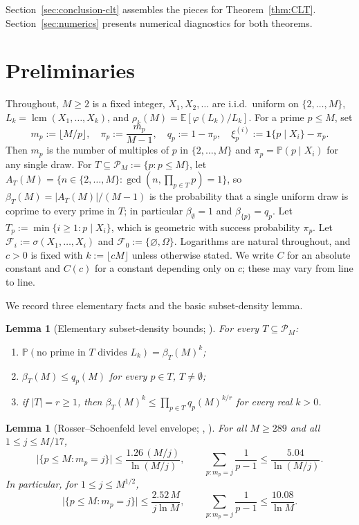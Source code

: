 \documentclass[11pt]{article}
\newtheorem{lemma}[theorem]{Lemma}
\theoremstyle{remark}
\newcommand{\lcm}{\operatorname{lcm}}
\newcommand{\gcdop}{\operatorname{gcd}}
\newcommand{\PP}{\mathbb{P}}
\newcommand{\EE}{\mathbb{E}}
\newcommand{\F}{\mathcal{F}}
\newcommand{\one}{\mathbf{1}}
\newcommand{\PM}{\mathcal{P}_M}
\begin{document}
Section~\ref{sec:conclusion-clt} assembles the pieces for Theorem~\ref{thm:CLT}. Section~\ref{sec:numerics} presents numerical diagnostics for both theorems.

\section{Preliminaries}\label{sec:prelim}

Throughout, $M \geq 2$ is a fixed integer, $X_1, X_2, \ldots$ are i.i.d.\ uniform on $\{2, \ldots, M\}$, $L_k = \lcm(X_1, \ldots, X_k)$, and $\rho_k(M) = \EE[\varphi(L_k)/L_k]$. For a prime $p \leq M$, set
\[
m_p := \lfloor M/p \rfloor, \quad \pi_p := \frac{m_p}{M-1}, \quad q_p := 1 - \pi_p, \quad \xi_p^{(i)} := \one\{p \mid X_i\} - \pi_p.
\]
Then $m_p$ is the number of multiples of $p$ in $\{2, \ldots, M\}$ and $\pi_p = \PP(p \mid X_i)$ for any single draw. For $T \subseteq \PM := \{p : p \leq M\}$, let $A_T(M) = \{n \in \{2, \ldots, M\} : \gcdop(n, \prod_{p \in T} p) = 1\}$, so $\beta_T(M) = |A_T(M)|/(M-1)$ is the probability that a single uniform draw is coprime to every prime in $T$; in particular $\beta_\emptyset = 1$ and $\beta_{\{p\}} = q_p$. Let $T_p := \min\{i \geq 1 : p \mid X_i\}$, which is geometric with success probability $\pi_p$. Let $\F_i := \sigma(X_1, \ldots, X_i)$ and $\F_0 := \{\varnothing, \Omega\}$. Logarithms are natural throughout, and $c > 0$ is fixed with $k := \lfloor cM \rfloor$ unless otherwise stated. We write $C$ for an absolute constant and $C(c)$ for a constant depending only on $c$; these may vary from line to line.

We record three elementary facts and the basic subset-density lemma.

\begin{lemma}[Elementary subset-density bounds; {\cite[Lems.~2.1--2.4]{wakid1}}]\label{lem:beta-basic}
For every $T \subseteq \PM$:
\begin{enumerate}[label=(\roman*), leftmargin=2em]
\item $\PP(\text{no prime in $T$ divides $L_k$}) = \beta_T(M)^k$;
\item $\beta_T(M) \leq q_p(M)$ for every $p \in T$, $T \neq \emptyset$;
\item if $|T| = r \geq 1$, then $\beta_T(M)^k \leq \prod_{p \in T} q_p(M)^{k/r}$ for every real $k > 0$.
\end{enumerate}
\end{lemma}

\begin{lemma}[Rosser--Schoenfeld level envelope; {\cite{RosserSchoenfeld1962}, \cite[Lem.~6.3]{wakid1}}]\label{lem:envelope}
For all $M \geq 289$ and all $1 \leq j \leq M/17$,
\[
\bigl|\{p \leq M : m_p = j\}\bigr| \leq \frac{1.26\,(M/j)}{\ln(M/j)}, \qquad \sum_{p \colon m_p = j} \frac{1}{p-1} \leq \frac{5.04}{\ln(M/j)}.
\]
In particular, for $1 \leq j \leq M^{1/2}$,
\[
\bigl|\{p \leq M : m_p = j\}\bigr| \leq \frac{2.52\,M}{j\ln M},
\qquad
\sum_{p \colon m_p = j} \frac{1}{p-1} \leq \frac{10.08}{\ln M}.
\]
\end{lemma}
\end{document}
